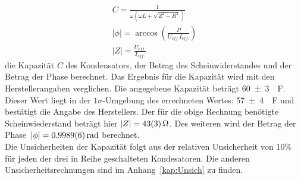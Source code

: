 \begin{align}
C=\frac{1}{\omega (\omega L+\sqrt{Z^2-R^2})}\\	
|\phi| = \arccos\left(\frac{\bar{P}}{U_{eff.}I_{eff.}}\right)\\
	|Z|=\frac{U_{eff.}}{I_{eff.}}
\end{align}
die Kapazität $C$ des Kondensators, der Betrag des Scheinwiderstandes und der Betrag der Phase berechnet. Das Ergebnis für die Kapazität wird mit den Herstellerangaben verglichen. Die angegebene Kapazität beträgt \SI{60+-3}{\mu F}.
Dieser Wert liegt in der $1\sigma$-Umgebung des errechneten Wertes: \SI{57+-4}{\mu F} und bestätigt die Angabe des Herstellers.
Der für die obige Rechnung benötigte Scheinwiederstand beträgt hier $	|Z| =\SI{43+-3}{\ohm}$. Des weiteren wird der Betrag der Phase~$|\phi| =\SI{0.9989+-0.0006}{rad}$ berechnet.\\
Die Unsicherheiten der Kapazität folgt aus der relativen Unsicherheit von $10\%$ für jeden der drei in Reihe geschalteten Kondesatoren. Die anderen Unsicherheitsrechnungen sind im Anhang~\ref{kap:Unsich} zu finden.
